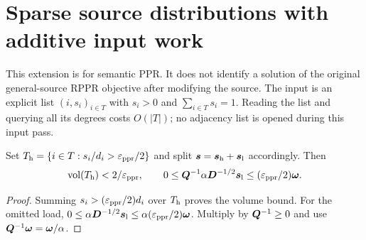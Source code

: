 \section{Sparse source distributions with additive input work}
\label{sec:revisit-sparse-sources}
This extension is for semantic PPR. It does not identify a solution of the
original general-source RPPR objective after modifying the source.
The input is an explicit list $(i,s_i)_{i\in T}$ with $s_i>0$ and
$\sum_{i\in T}s_i=1$. Reading the list and querying all its degrees costs
$O(|T|)$; no adjacency list is opened during this input pass.

\begin{lemma}
\label{lem:revisit-small-sources}
Set $T_{\rm h}=\{i\in T:s_i/d_i>\varepsilon_{\mathrm{ppr}}/2\}$ and split
$\bm{s}=\bm{s}_{\rm h}+\bm{s}_{\rm l}$ accordingly. Then
\[
 \operatorname{vol}(T_{\rm h})<2/\varepsilon_{\mathrm{ppr}},\qquad
 0\leq\bm{Q}^{-1}\alpha\bm{D}^{-1/2}\bm{s}_{\rm l}
                   \leq(\varepsilon_{\mathrm{ppr}}/2)\bm{\omega}.
\]
\end{lemma}
\begin{proof}
Summing $s_i>(\varepsilon_{\mathrm{ppr}}/2)d_i$ over $T_{\rm h}$ proves the volume bound.
For the omitted load,
$0\leq\alpha\bm{D}^{-1/2}\bm{s}_{\rm l}
\leq\alpha(\varepsilon_{\mathrm{ppr}}/2)\bm{\omega}$.
Multiply by $\bm{Q}^{-1}\geq0$ and use
$\bm{Q}^{-1}\bm{\omega}=\bm{\omega}/\alpha$.
\end{proof}

